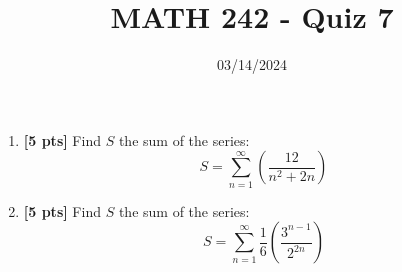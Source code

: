 \documentclass[12pt]{article}
\title{MATH 242 - Quiz 7}
\date{03/14/2024}
\begin{document}
\maketitle

\begin{enumerate}

\item \textbf{[5 pts]} Find $S$ the sum of the series: $$S=\sum_{n=1}^{\infty}\left(\frac{12}{n^2+2n}\right)$$
\newpage
\item \textbf{[5 pts]}  Find $S$ the sum of the series:
$$S=\sum_{n=1}^{\infty}\frac{1}{6}\left(\frac{3^{n-1}}{2^{2n}}\right)$$
\vfill

\end{enumerate}
\end{document}
